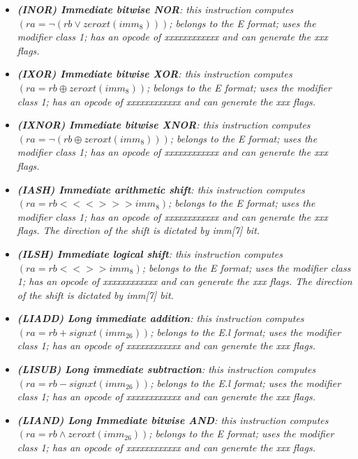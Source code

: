 \begin{multicols}{2}
\begin{itemize}
                \item \textit{\textbf{(INOR) Immediate bitwise NOR}: this instruction computes \((ra = \neg(rb \vee zeroxt(imm_8)))\); belongs to the E format; uses the modifier class 1; has an opcode of xxxxxxxxxxxx and can generate the xxx flags.}

                \item \textit{\textbf{(IXOR) Immediate bitwise XOR}: this instruction computes \((ra = rb \oplus zeroxt(imm_8))\); belongs to the E format; uses the modifier class 1; has an opcode of xxxxxxxxxxxx and can generate the xxx flags.}

                \item \textit{\textbf{(IXNOR) Immediate bitwise XNOR}: this instruction computes \((ra = \neg(rb \oplus zeroxt(imm_8)))\); belongs to the E format; uses the modifier class 1; has an opcode of xxxxxxxxxxxx and can generate the xxx flags.}

                \item \textit{\textbf{(IASH) Immediate arithmetic shift}: this instruction computes \((ra = rb <<<>>> imm_8)\); belongs to the E format; uses the modifier class 1; has an opcode of xxxxxxxxxxxx and can generate the xxx flags. The direction of the shift is dictated by imm[7] bit.}

                \item \textit{\textbf{(ILSH) Immediate logical shift}: this instruction computes \((ra = rb <<>> imm_8)\); belongs to the E format; uses the modifier class 1; has an opcode of xxxxxxxxxxxx and can generate the xxx flags. The direction of the shift is dictated by imm[7] bit.}

                \item \textit{\textbf{(LIADD) Long immediate addition}: this instruction computes \((ra = rb + signxt(imm_{26}))\); belongs to the E.l format; uses the modifier class 1; has an opcode of xxxxxxxxxxxx and can generate the xxx flags.}

                \item \textit{\textbf{(LISUB) Long immediate subtraction}: this instruction computes \((ra = rb - signxt(imm_{26}))\); belongs to the E.l format; uses the modifier class 1; has an opcode of xxxxxxxxxxxx and can generate the xxx flags.}

                \item \textit{\textbf{(LIAND) Long Immediate bitwise AND}: this instruction computes \((ra = rb \wedge zeroxt(imm_{26}))\); belongs to the E format; uses the modifier class 1; has an opcode of xxxxxxxxxxxx and can generate the xxx flags.}


\end{itemize}
\end{multicols}
